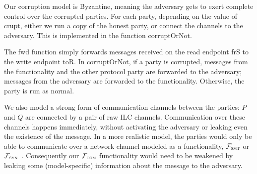 Our corruption model is Byzantine, meaning the adversary gets to exert complete
control over the corrupted parties.  For each party, depending on the value of
\textsf{crupt}, either we run a copy of the honest party, or connect the
channels to the adversary. This is implemented in the function
\textsf{corruptOrNot}.
%


The \textsf{fwd} function simply forwards messages received on the read endpoint
\textsf{frS} to the write endpoint \textsf{toR}. In \textsf{corruptOrNot}, if a
party is corrupted, messages from the functionality and the other protocol party
are forwarded to the adversary; messages from the adversary are forwarded to the
functionality. Otherwise, the party is run as normal.

We also model a strong form of communication channels between the parties: $P$
and $Q$ are connected by a pair of raw ILC channels. Communication over these
channels happens immediately, without activating the adversary or leaking even
the existence of the message.  In a more realistic model, the parties would only
be able to communicate over a network channel modeled as a functionality,
$\mathcal{F}_{\textnormal{\ensuremath{{\mathsf {{\textsc{smt}}}}}}}$ or $\mathcal{F}_{\textnormal{\ensuremath{{\mathsf {{\textsc{syn}}}}}}}$~\cite{canetti2001universally}.
Consequently our $\mathcal{F}_{\textnormal{\ensuremath{{\mathsf {{\textsc{com}}}}}}}$ functionality would need to be weakened by
leaking some (model-specific) information about the message to the adversary.

%


